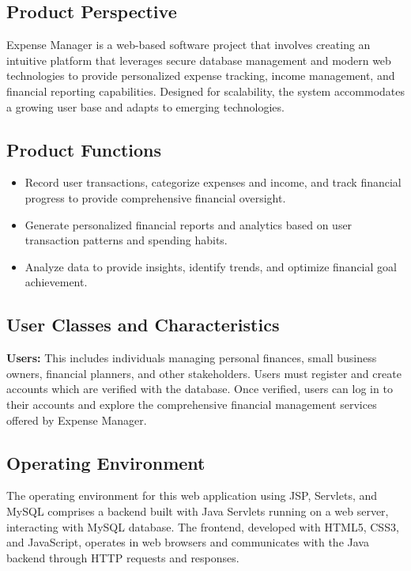 \subsection{Product Perspective}

Expense Manager is a web-based software project that involves creating an intuitive platform that leverages secure database management and modern web technologies to provide personalized expense tracking, income management, and financial reporting capabilities. Designed for scalability, the system accommodates a growing user base and adapts to emerging technologies.

\subsection{Product Functions}

\begin{itemize}
\item Record user transactions, categorize expenses and income, and track financial progress to provide comprehensive financial oversight.
\item Generate personalized financial reports and analytics based on user transaction patterns and spending habits.
\item Analyze data to provide insights, identify trends, and optimize financial goal achievement.
\end{itemize}

\subsection{User Classes and Characteristics}

\textbf{Users:} This includes individuals managing personal finances, small business owners, financial planners, and other stakeholders. Users must register and create accounts which are verified with the database. Once verified, users can log in to their accounts and explore the comprehensive financial management services offered by Expense Manager.

\subsection{Operating Environment}

The operating environment for this web application using JSP, Servlets, and MySQL comprises a backend built with Java Servlets running on a web server, interacting with MySQL database. The frontend, developed with HTML5, CSS3, and JavaScript, operates in web browsers and communicates with the Java backend through HTTP requests and responses.


